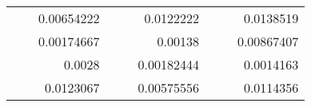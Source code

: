 \begin{table}[H]
\begin{tabular}{|ccrccrccc}
\rowcolor[HTML]{DAE8FC} 
\multicolumn{1}{|c|}{\cellcolor[HTML]{FFFFC7}}                                & \multicolumn{1}{c|}{\cellcolor[HTML]{DAE8FC}}                      & \multicolumn{1}{r|}{\cellcolor[HTML]{DAE8FC}0.00654222}  & \multicolumn{1}{c|}{\cellcolor[HTML]{FFFFC7}}                                & \multicolumn{1}{c|}{\cellcolor[HTML]{DAE8FC}}                       & \multicolumn{1}{r|}{\cellcolor[HTML]{DAE8FC}0.0122222}   & \multicolumn{1}{c|}{\cellcolor[HTML]{FFFFC7}}                                & \multicolumn{1}{c|}{\cellcolor[HTML]{DAE8FC}}                      & \multicolumn{1}{r|}{\cellcolor[HTML]{DAE8FC}0.0138519}   \\ \cline{3-3} \cline{6-6} \cline{9-9} 
\multicolumn{1}{|c|}{\cellcolor[HTML]{FFFFC7}}                                & \multicolumn{1}{c|}{\cellcolor[HTML]{DAE8FC}}                      & \multicolumn{1}{r|}{\cellcolor[HTML]{DDFDFF}0.00174667}  & \multicolumn{1}{c|}{\cellcolor[HTML]{FFFFC7}}                                & \multicolumn{1}{c|}{\cellcolor[HTML]{DAE8FC}}                       & \multicolumn{1}{r|}{\cellcolor[HTML]{DDFDFF}0.00138}     & \multicolumn{1}{c|}{\cellcolor[HTML]{FFFFC7}}                                & \multicolumn{1}{c|}{\cellcolor[HTML]{DAE8FC}}                      & \multicolumn{1}{r|}{\cellcolor[HTML]{DDFDFF}0.00867407}  \\ \cline{3-3} \cline{6-6} \cline{9-9} 
\rowcolor[HTML]{DAE8FC} 
\multicolumn{1}{|c|}{\cellcolor[HTML]{FFFFC7}}                                & \multicolumn{1}{c|}{\cellcolor[HTML]{DAE8FC}}                      & \multicolumn{1}{r|}{\cellcolor[HTML]{DAE8FC}0.0028}      & \multicolumn{1}{c|}{\cellcolor[HTML]{FFFFC7}}                                & \multicolumn{1}{c|}{\cellcolor[HTML]{DAE8FC}}                       & \multicolumn{1}{r|}{\cellcolor[HTML]{DAE8FC}0.00182444}  & \multicolumn{1}{c|}{\cellcolor[HTML]{FFFFC7}}                                & \multicolumn{1}{c|}{\cellcolor[HTML]{DAE8FC}}                      & \multicolumn{1}{r|}{\cellcolor[HTML]{DAE8FC}0.0014163}   \\ \cline{3-3} \cline{6-6} \cline{9-9} 
\multicolumn{1}{|c|}{\cellcolor[HTML]{FFFFC7}}                                & \multicolumn{1}{c|}{\cellcolor[HTML]{DAE8FC}}                      & \multicolumn{1}{r|}{\cellcolor[HTML]{DDFDFF}0.0123067}   & \multicolumn{1}{c|}{\cellcolor[HTML]{FFFFC7}}                                & \multicolumn{1}{c|}{\cellcolor[HTML]{DAE8FC}}                       & \multicolumn{1}{r|}{\cellcolor[HTML]{DDFDFF}0.00575556}  & \multicolumn{1}{c|}{\cellcolor[HTML]{FFFFC7}}                                & \multicolumn{1}{c|}{\cellcolor[HTML]{DAE8FC}}                      & \multicolumn{1}{r|}{\cellcolor[HTML]{DDFDFF}0.0114356}   \\ \cline{3-3} \cline{6-6} \cline{9-9} 

\end{tabular}
\end{table}
